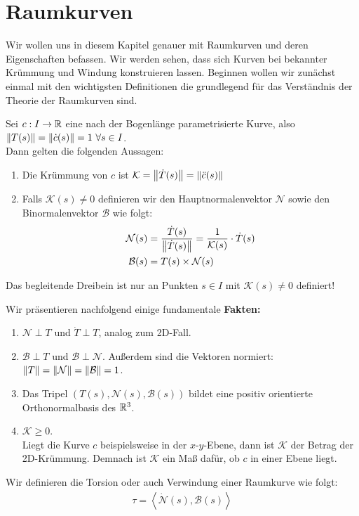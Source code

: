 \chapter{Raumkurven}
Wir wollen uns in diesem Kapitel genauer mit Raumkurven und deren Eigenschaften befassen. Wir werden sehen, dass sich Kurven bei bekannter Krümmung und Windung konstruieren lassen. Beginnen wollen wir zunächst einmal mit den wichtigsten Definitionen die grundlegend für das Verständnis der Theorie der Raumkurven sind.
\begin{defs}
	Sei $c: I \rightarrow \mathbb{R}$ eine nach der Bogenlänge parametrisierte Kurve, also $\norm{T(s)} = \norm{\dot{c}(s)} = 1 \ \forall s \in I$. \\
	Dann gelten die folgenden Aussagen:
\begin{enumerate}
	\item Die Krümmung von $c$ ist $\mathcal{K} = \norm{\dot{T}(s)} = \norm{\ddot{c}(s)}$
	\item Falls $\mathcal{K}(s) \neq 0$ definieren wir den Hauptnormalenvektor $\mathcal{N}$ sowie den Binormalenvektor $\mathcal{B}$ wie folgt:
	\begin{align}
	\mathcal{N}(s) &= \frac{\dot{T}(s)}{\norm{\dot{T}(s)}} = \frac{1}{\mathcal{K}(s)}\cdot\dot{T}(s) \\
		 \mathcal{B}(s) &= T(s) \times \mathcal{N}(s)
	\end{align}
\end{enumerate}
\end{defs}

\begin{bem}
	Das begleitende Dreibein ist nur an Punkten $s \in I$ mit $\mathcal{K}(s) \neq 0$ definiert!
\end{bem}
Wir präsentieren nachfolgend einige fundamentale \textbf{Fakten:}
\begin{enumerate}
	\item $\mathcal{N} \perp T$ und $\dot{T} \perp T$, analog zum 2D-Fall.
	\item $\mathcal{B} \perp T$ und $\mathcal{B}\perp\mathcal{N}$. Außerdem sind die Vektoren normiert: $\norm{T} = \norm{\mathcal{N}} = \norm{\mathcal{B}} = 1$. 
	\item Das Tripel $\left(T(s),\mathcal{N}(s),\mathcal{B}(s)\right)$ bildet eine positiv orientierte Orthonormalbasis des $\mathbb{R}^3$.
	\item $\mathcal{K} \geq 0$.\\
		 Liegt die Kurve $c$ beispielsweise in der $x$-$y$-Ebene, dann ist $\mathcal{K}$ der Betrag der 2D-Krümmung. Demnach ist $\mathcal{K}$ ein Maß dafür, ob $c$ in einer Ebene liegt.
\end{enumerate}
\begin{defs}
	Wir definieren die Torsion oder auch Verwindung einer Raumkurve wie folgt: 
	\begin{align}
		\tau = \left<\dot{\mathcal{N}}(s),\mathcal{B}(s)\right> 
	\end{align}
\end{defs}

